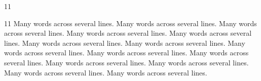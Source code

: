 \documentclass[paper=A4]{ropas-poster}
\begin{document}
\begin{postergrid}{1}{1}
\begin{posterblock}{1}{1}
Many words across several lines. Many words across several lines. Many words across several lines. Many words across several lines. Many words across several lines. Many words across several lines. Many words across several lines. Many words across several lines. Many words across several lines. Many words across several lines. Many words across several lines. Many words across several lines. Many words across several lines. Many words across several lines. 
\end{posterblock}
\end{postergrid}
\end{document}
